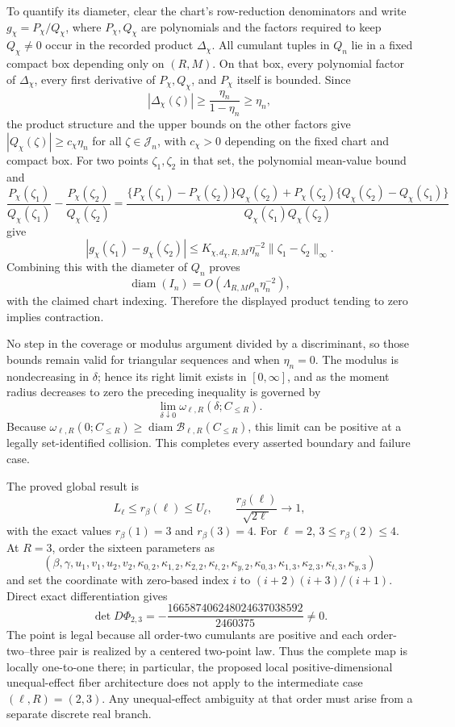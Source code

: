 To quantify its diameter, clear the chart's row-reduction denominators and write \(g_{\chi}=P_\chi/Q_\chi\), where \(P_\chi,Q_\chi\) are polynomials and the factors required to keep \(Q_\chi\ne0\) occur in the recorded product \(\Delta_\chi\).  All cumulant tuples in \(Q_n\) lie in a fixed compact box depending only on \((R,M)\).  On that box, every polynomial factor of \(\Delta_\chi\), every first derivative of \(P_\chi,Q_\chi\), and \(P_\chi\) itself is bounded.  Since
\[
 |\Delta_\chi(\zeta)|\ge\frac{\eta_n}{1-\eta_n}\ge\eta_n,
\]
the product structure and the upper bounds on the other factors give \(|Q_\chi(\zeta)|\ge c_\chi\eta_n\) for all \(\zeta\in\mathcal J_n\), with \(c_\chi>0\) depending on the fixed chart and compact box.  For two points \(\zeta_1,\zeta_2\) in that set, the polynomial mean-value bound and
\[
 \frac{P_\chi(\zeta_1)}{Q_\chi(\zeta_1)}-
 \frac{P_\chi(\zeta_2)}{Q_\chi(\zeta_2)}
 =\frac{\{P_\chi(\zeta_1)-P_\chi(\zeta_2)\}Q_\chi(\zeta_2)
       +P_\chi(\zeta_2)\{Q_\chi(\zeta_2)-Q_\chi(\zeta_1)\}}
       {Q_\chi(\zeta_1)Q_\chi(\zeta_2)}
\]
give
\[
 |g_\chi(\zeta_1)-g_\chi(\zeta_2)|
 \le K_{\chi,d_\chi,R,M}\eta_n^{-2}
       \|\zeta_1-\zeta_2\|_\infty.
\]
Combining this with the diameter of \(Q_n\) proves
\[
 \operatorname{diam}(I_n)=O(\Lambda_{R,M}\rho_n\eta_n^{-2}),
\]
with the claimed chart indexing.  Therefore the displayed product tending to zero implies contraction.

No step in the coverage or modulus argument divided by a discriminant, so those bounds remain valid for triangular sequences and when \(\eta_n=0\).  The modulus is nondecreasing in \(\delta\); hence its right limit exists in \([0,\infty]\), and as the moment radius decreases to zero the preceding inequality is governed by
\[
 \lim_{\delta\downarrow0}\omega_{\ell,R}(\delta;C_{\le R}).
\]
Because \(\omega_{\ell,R}(0;C_{\le R})\ge
\operatorname{diam}\mathcal B_{\ell,R}(C_{\le R})\), this limit can be positive at a legally set-identified collision.  This completes every asserted boundary and failure case.

The proved global result is
\[
 L_\ell\le r_\beta(\ell)\le U_\ell,
 \qquad
 \frac{r_\beta(\ell)}{\sqrt{2\ell}}\longrightarrow1,
\]
with the exact values \(r_\beta(1)=3\) and \(r_\beta(3)=4\).  For \(\ell=2\), \(3\le r_\beta(2)\le4\).  At \(R=3\), order the sixteen parameters as
\[
 (\beta,\gamma,u_1,v_1,u_2,v_2,
 \kappa_{0,2},\kappa_{1,2},\kappa_{2,2},\kappa_{t,2},\kappa_{y,2},
 \kappa_{0,3},\kappa_{1,3},\kappa_{2,3},\kappa_{t,3},\kappa_{y,3})
\]
and set the coordinate with zero-based index \(i\) to \((i+2)(i+3)/(i+1)\).  Direct exact differentiation gives
\[
 \det D\Phi_{2,3}
 =-\frac{166587406248024637038592}{2460375}\ne0.
\]
The point is legal because all order-two cumulants are positive and each order-two--three pair is realized by a centered two-point law.  Thus the complete map is locally one-to-one there; in particular, the proposed local positive-dimensional unequal-effect fiber architecture does not apply to the intermediate case \((\ell,R)=(2,3)\).  Any unequal-effect ambiguity at that order must arise from a separate discrete real branch.

